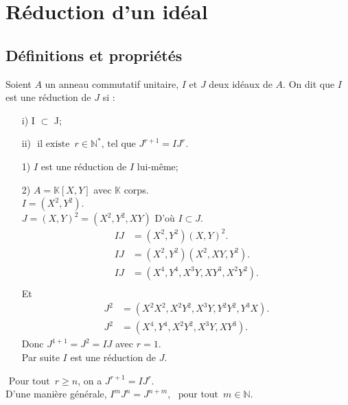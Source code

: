 \section{Réduction d'un idéal}
\subsection{Définitions et propriétés}
\begin{madefinition}
	Soient $A$ un anneau commutatif unitaire, $I$ et $J$ deux id\'eaux de $A$.
	On dit que $I$ est une réduction de $J$ si :
	\begin{enumerate}
		\item[i)] I $\subset$ J;
		\item[ii)] $\text{ il existe } \, r\in \mathbb{N}^{*} \text{, tel que } J^{r+1} = IJ^{r}$.
	\end{enumerate}
\end{madefinition}
\begin{monexemple}
	\begin{enumerate}
		\item[1)] $I$ est une réduction de $I$ lui-même;
		\item[2)] $A =\mathbb{K}[X,Y]$ avec $\mathbb{K}$ corps.\\
		$I = (X^2, Y^2)$.\\
		$J = (X,Y)^2 = (X^2, Y^2, XY) $ D'où $I \subset J$.
		\begin{align*}
			IJ&= (X^{2},Y^{2})(X,Y)^{2}.\\
			IJ&= (X^{2},Y^{2})(X^{2},XY,Y^{2}).\\
			IJ&= (X^{4},Y^{4},X^{3}Y,XY^{3},X^{2}Y^{2}).\\
		\end{align*}
		Et \\ 
		\begin{align*}
			J^2 &= (X^2X^2, X^2Y^2, X^3Y, Y^2Y^2, Y^3X).\\
			J^2&= (X^4, Y^4, X^2Y^2, X^3Y, XY^3).
		\end{align*}
		Donc $J^{1+1} = J^2 = IJ $ avec $r=1$.\\
		Par suite $I$ est une réduction de $J$.
	\end{enumerate}
\end{monexemple}
\begin{maremarque}
	$\text{ Pour tout } \, r\geq n$, on a $J^{r+1} = IJ^{r}$.\\
	D'une manière générale, $I^{m}J^{n}=J^{n+m}, \, \, \text{ pour tout } \, m\in \mathbb{N}$.	
\end{maremarque}

